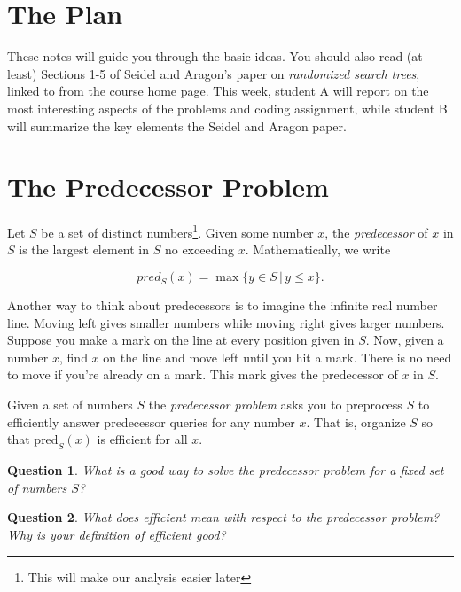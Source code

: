 \documentclass[11pt]{article}
\newtheorem{question}{Question}
\begin{document}
\section{The Plan}
These notes will guide you through the basic ideas.  You should also read (at least) Sections 1-5 of
Seidel and Aragon's paper on {\em randomized search trees}, linked to from the course home page.
This week, student A will report on the most interesting aspects of the problems and coding assignment,
while student B will summarize the key elements the Seidel and Aragon paper.

\section{The Predecessor Problem}

Let $S$ be a set of distinct numbers\footnote{This will make our analysis easier later}.  Given some number $x$, the {\em predecessor} of $x$ in $S$ is the largest element in $S$ no exceeding  $x$.  Mathematically, we write

\[
pred_{S}(x) = \max \{y \in S \,|\, y \leq x\}.
\]

Another way to think about predecessors is to imagine the infinite real number line.  Moving left gives smaller numbers while moving right gives larger numbers.  Suppose you make a mark on the line at every position given in $S$.  Now, given a number $x$, find $x$ on the line and move left until you hit a mark.  There is no need to move if you're already on a mark.  This mark gives the predecessor of $x$ in $S$.

 
Given a set of numbers $S$ the {\em predecessor problem} asks you to preprocess $S$ to efficiently answer predecessor queries for any number $x$.  That is, organize $S$ so that  $\mbox{pred}_{S}(x)$ is efficient for all $x$.

\begin{question}
What is a good way to solve the predecessor problem for a fixed set of numbers $S$?
\end{question}

\begin{question}
What does {\em efficient} mean with respect to the predecessor problem?  Why is your definition of efficient good?  
\end{question}
\end{document}
